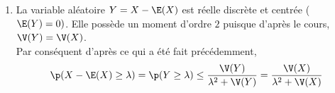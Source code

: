 \documentclass[8pt]{book}
\begin{document}
\begin{enumerate}
\begin{enumerate}
			\\
			Ainsi, l'inégalité optimale que l'on peut atteindre est donnée par $u=u_1$ :\\
			$\p(X\geq \lambda)\leq \displaystyle\frac{\V(X)+\left(\displaystyle\frac{\V(X)}{\lambda}\right)^2}{\left(\lambda+\displaystyle\frac{\V(X)}{\lambda}\right)^2}=\frac{\lambda^2\V(X)+\V(X)^2}{(\lambda^2+\V(X))^2}=\frac{\V(X)(\lambda^2+\V(X))}{(\lambda^2+\V(X))^2}=\frac{\V(X)}{\lambda^2+\V(X)}$.
		\end{enumerate}
		\item La variable aléatoire $Y=X-\E(X)$ est réelle discrète et centrée ($\E(Y)=0)$. Elle possède un moment d'ordre $2$ puisque d'après le cours, $\V(Y)=\V(X)$.\\
		Par conséquent d'après ce qui a été fait précédemment,\\
		$$\p(X-\E(X)\geq \lambda)=\p(Y\geq \lambda)\leq \displaystyle\frac{\V(Y)}{\lambda^2+\V(Y)}=\frac{\V(X)}{\lambda^2+\V(X)}$$
	\end{enumerate}
	
\end{document}
